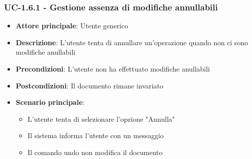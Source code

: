 \documentclass[11pt,a4paper]{article}
\begin{document}
\subsubsection{UC-1.6.1 - Gestione assenza di modifiche annullabili}
\begin{itemize}
    \item \textbf{Attore principale}: Utente generico
    \item \textbf{Descrizione}: L'utente tenta di annullare un'operazione quando non ci sono modifiche anullabili
    \item \textbf{Precondizioni}: L'utente non ha effettuato modifiche anullabili
    \item \textbf{Postcondizioni}: Il documento rimane invariato
    \item \textbf{Scenario principale}:
        \begin{itemize}
            \item L'utente tenta di selezionare l'opzione "Annulla"
            \item Il sistema informa l'utente con un messaggio
            \item Il comando undo non modifica il documento
        \end{itemize}
\end{itemize}
\end{document}
